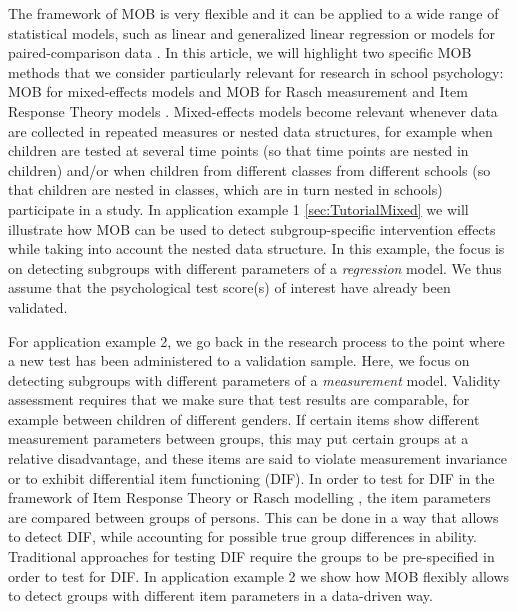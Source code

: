 \documentclass[doc,floatsintext,natbib]{apa7}
\begin{document}
The framework of MOB is very flexible and it can be applied to a wide range of statistical models, such as linear and generalized linear regression \citep{KopAugStr:2013,ZeilyHoth08} or models for paired-comparison data \citep{StrWicZei:2011:JoEaBS,WiedyFrick21}. In this article, we will highlight two specific MOB methods that we consider particularly relevant for research in school psychology: MOB for mixed-effects models \citep{FokkySmit18} and MOB for Rasch measurement and Item Response Theory models \citep[IRT,][]{StrKopZei:2015:P,KomStrZei:2017:EaPM,HenDebStr:2023:EPM}. Mixed-effects models become relevant whenever data are collected in repeated measures or nested data structures, for example when children are tested at several time points (so that time points are nested in children) and/or when children from different classes from different schools (so that children are nested in classes, which are in turn nested in schools) participate in a study. In application example 1 \ref{sec:TutorialMixed} we will illustrate how MOB can be used to detect subgroup-specific intervention effects while taking into account the nested data structure. In this example, the focus is on detecting subgroups with different parameters of a \textit{regression} model. We thus assume that the psychological test score(s) of interest  have already been validated. 

For application example 2, we go back in the research process to the point where a new test has been administered to a validation sample. Here, we focus on detecting subgroups with different parameters of a \textit{measurement} model. Validity assessment requires that we make sure that test results are comparable, for example between children of different genders. If certain items show different measurement parameters between groups, this may put certain groups at a relative disadvantage, and these items are said to violate measurement invariance or to exhibit differential item functioning (DIF). In order to test for DIF in the framework of Item Response Theory or Rasch modelling \citep{AnthyDiPe16,DebStrZei:2022:CRC,Mall97}, the item parameters are compared between groups of persons. This can be done in a way that allows to detect DIF, while accounting for possible true group differences in ability. Traditional approaches for testing DIF require the groups to be pre-specified in order to test for DIF. In application example 2 we show how MOB flexibly allows to detect groups with different item parameters in a data-driven way. 
\end{document}

